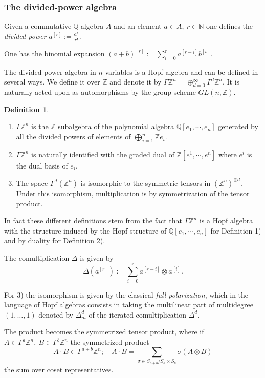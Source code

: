\documentclass[10pt]{amsart}
\theoremstyle{definition}
\newtheorem{definition}[theorem]{Definition}
\theoremstyle{remark}
\newcommand{\Z}{\mathbb Z}
\newcommand{\N}{\mathbb N}
\newcommand{\Q}{\mathbb Q}
\newcommand{\Ga}{\Gamma}
\newcommand{\ot}{\otimes}
\begin{document}
\subsubsection{The divided-power algebra}  

Given a commutative $\Q$-algebra $A$ and an element $a\in A,\ r\in \N$ one defines the {\em divided power $a^{[r]}:=\frac {a^r}{r!}$}. 

 One has the binomial expansion $(a+b)^{[r]}:=\sum_{i=0}^r a^{[r-i]}b^{[i]}$.\medskip




The divided-power algebra in $n$ variables is a Hopf algebra and  can be defined in several ways. We define it over $\Z$ and denote it by  $\Ga \Z^n=\oplus_{d=0}^\infty \Ga^d \Z^n$. It is naturally acted upon as automorphisms by the group scheme $GL(n,\Z)$.
\begin{definition}\label{dpa}
\begin{enumerate}\item  $\Ga \Z^n$ is the $\Z$  subalgebra of the polynomial algebra $\Q[e_1,\cdots,e_n]$  generated by all the divided powers of elements of $\bigoplus_{i=1}^n\Z e_i$.\item   $\Ga \Z^n$ is naturally identified with the graded dual of  $\Z[e^1,\cdots,e^n]$  where $e^i$ is the dual basis of $e_i$.

\item The space $\Gamma^d(\Z^n)$ is isomorphic to the symmetric tensors in  $(\Z^n)^{\otimes d}$. Under this isomorphism,  multiplication is by symmetrization of the tensor product.\end{enumerate}\end{definition}

In fact  these different definitions  stem from the fact that $\Ga \Z^n$ is a Hopf algebra with the structure induced by the Hopf structure of  $\Q[e_1,\cdots,e_n]$ for Definition 1) and by duality   for Definition 2). 

The comultiplication $\Delta$  is given by   $$\Delta(a ^{[r]}):=\sum_{i=0}^r a^{[r-i]}\ot a^{[i]}.$$


For   3) the isomorphism is given by  the classical {\em full polarization}, which in the language of Hopf algebras consists in taking  the multilinear part of multidegree $(1,\ldots,1)$  denoted by $\Delta^d_m$ of the iterated  comultiplication $\Delta^d$. 


 The product becomes   the symmetrized tensor product, where if $A\in \Ga^a \Z^n,\ B\in \Ga^b \Z^n$  the symmetrized product
$$A\cdot B\in \Ga^{a+b}\Z^n;\quad A\cdot B=\sum_{\sigma\in S_{a+b}/S_{a }\times S_{ b}} \sigma(A\ot B)$$ the sum over coset representatives.
\end{document}

